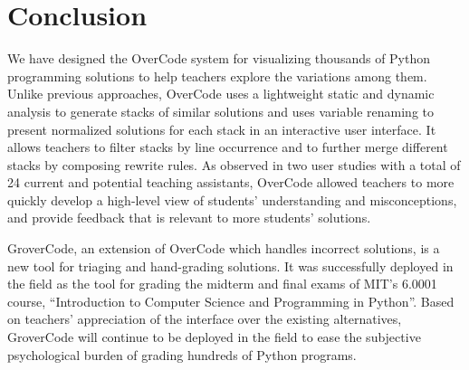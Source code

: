 
\section{Conclusion}
We have designed the OverCode system for visualizing thousands of Python programming solutions to help teachers explore the variations among them. Unlike previous approaches, OverCode uses a lightweight static and dynamic analysis to generate stacks of similar solutions and uses variable renaming to present normalized solutions for each stack in an interactive user interface. It allows teachers to filter stacks by line occurrence and to further merge different stacks by composing rewrite rules. As observed in two user studies with a total of 24 current and potential teaching assistants, OverCode allowed teachers to more quickly develop a high-level view of students' understanding and misconceptions, and provide feedback that is relevant to more students' solutions. 

GroverCode, an extension of OverCode which handles incorrect solutions, is a new tool for triaging and hand-grading solutions. It was successfully deployed in the field as the tool for grading the midterm and final exams of MIT's 6.0001 course, ``Introduction to Computer Science and Programming in Python''. Based on teachers' appreciation of the interface over the existing alternatives, GroverCode will continue to be deployed in the field to ease the subjective psychological burden of grading hundreds of Python programs. %
